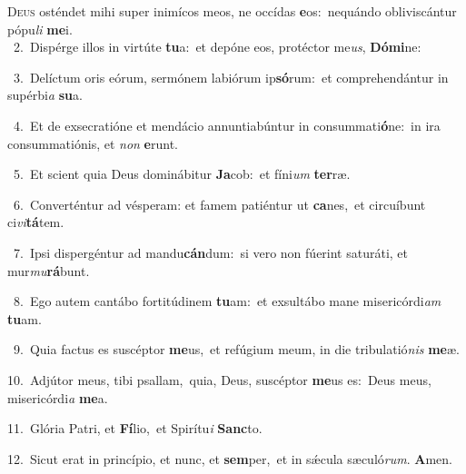 \lettrine{\initial\textcolor{\initialcolor}{D}}{eus} osténdet mihi super inimícos meos, ne occídas \textbf{e}\-os:~\star nequándo obliviscántur pópu\textit{li} \textbf{me}\-i.\\
{\numbfont\textcolor{\numbcolor}{~2.}}~Dispérge illos in virtúte \textbf{tu}\-a:~\star et depóne eos, protéctor me\-\textit{us}\-, \textbf{Dó}\-\textbf{mi}ne:\par
{\numbfont\textcolor{\numbcolor}{~3.}}~Delíctum oris eórum, sermónem labiórum ip\-\textbf{só}\-rum:~\star et comprehendántur in supérbi\textit{a} \textbf{su}\-a.\par
{\numbfont\textcolor{\numbcolor}{~4.}}~Et de exsecratióne et mendácio annuntiabúntur in consummati\-\textbf{ó}\-ne:~\star in ira consummatiónis, et \textit{non} \textbf{e}\-runt.\par
{\numbfont\textcolor{\numbcolor}{~5.}}~Et scient quia Deus dominábitur \textbf{Ja}\-cob:~\star et fíni\textit{um} \textbf{ter}\-ræ.\par
{\numbfont\textcolor{\numbcolor}{~6.}}~Converténtur ad vésperam: et famem patiéntur ut \textbf{ca}\-nes,~\star et circuíbunt ci\-\textit{vi}\-\textbf{tá}tem.\par
{\numbfont\textcolor{\numbcolor}{~7.}}~Ipsi dispergéntur ad mandu\-\textbf{cán}\-dum:~\star si vero non fúerint saturáti, et mur\-\textit{mu}\-\textbf{rá}bunt.\par
{\numbfont\textcolor{\numbcolor}{~8.}}~Ego autem cantábo fortitúdinem \textbf{tu}\-am:~\star et exsultábo mane misericórdi\textit{am} \textbf{tu}\-am.\par
{\numbfont\textcolor{\numbcolor}{~9.}}~Quia factus es suscéptor \textbf{me}\-us,~\star et refúgium meum, in die tribulatió\textit{nis} \textbf{me}\-æ.\par
{\numbfont\textcolor{\numbcolor}{10.}}~Adjútor meus, tibi psallam,~\dagger quia, Deus, suscéptor \textbf{me}\-us es:~\star Deus meus, misericórdi\textit{a} \textbf{me}\-a.\par
{\numbfont\textcolor{\numbcolor}{11.}}~Glória Patri, et \textbf{Fí}\-lio,~\star et Spirítu\textit{i} \textbf{Sanc}\-to.\par
{\numbfont\textcolor{\numbcolor}{12.}}~Sicut erat in princípio, et nunc, et \textbf{sem}\-per,~\star et in sǽcula sæculó\-\textit{rum}\-. \textbf{A}\-men.\par
